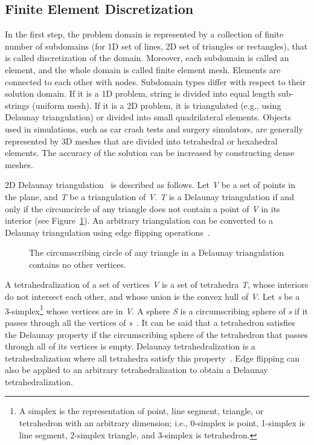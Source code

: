 \subsection{Finite Element Discretization}
\label{sec:fed}

In the first step, the problem domain is represented by a collection of finite number of subdomains (for 1D set of lines, 2D set of triangles or rectangles), that is called discretization of the domain. Moreover, each subdomain is called an element, and the whole domain is called finite element mesh. Elements are connected to each other with nodes. Subdomain types differ with respect to their solution domain. If it is a 1D problem, string is divided into equal length sub-strings (uniform mesh). If it is a 2D problem, it is triangulated (e.g., using Delaunay triangulation) or divided into small quadrilateral elements. Objects used in simulations, such as car crash tests and surgery simulators, are generally represented by 3D meshes that are divided into tetrahedral or hexahedral elements. The  accuracy of the solution can be increased by constructing dense meshes.

2D Delaunay triangulation~\cite{Delaunay34} is described as follows. Let \textit{V} be a set of points in the plane, and \textit{T} be a triangulation of \textit{V}. \textit{T} is a Delaunay triangulation if and only if the circumcircle of any triangle does not contain a point of \textit{V} in its interior (see Figure~\ref{fig:delaunay}). An arbitrary triangulation can be converted to a Delaunay triangulation using edge flipping operations~\cite{Prep93}.

\begin{figure}[h]
\centerline{}
\caption{ The circumscribing circle of any triangle in a Delaunay triangulation contains no other vertices.}
\label{fig:delaunay}
\end{figure}

A tetrahedralization of a set of vertices \textit{V} is a set of tetrahedra \textit{T}, whose interiors do not intersect each other, and whose union is the convex hull of \textit{V}. Let \textit{s} be a 3-simplex\footnote{A simplex is the representation of point, line segment, triangle, or tetrahedron with an arbitrary dimension; i.e., 0-simplex is point, 1-simplex is line segment, 2-simplex triangle, and 3-simplex is tetrahedron.} whose vertices are in \textit{V}. A sphere \textit{S} is a circumscribing sphere of \textit{s} if it passes through all the vertices of \textit{s}~\cite{si2011}. It can be said that a tetrahedron satisfies the  Delaunay property if the circumscribing sphere of the tetrahedron that passes through all of its vertices is empty. Delaunay tetrahedralization is a tetrahedralization where all tetrahedra satisfy this property~\cite{Edelsbrunner01}. Edge flipping can also be applied to an arbitrary tetrahedralization to obtain a Delaunay tetrahedralization.

